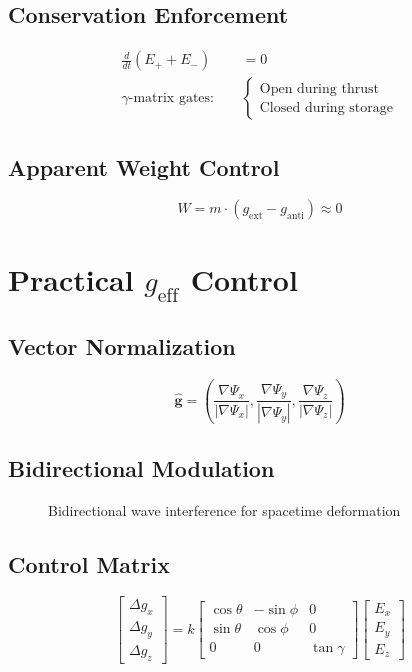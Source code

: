 \documentclass{article}
\begin{document}
\subsection{Conservation Enforcement}
\begin{align*}
\frac{d}{dt}(E_+ + E_-) &= 0 \\
\gamma\text{-matrix gates}: \quad & \begin{cases} 
\text{Open during thrust} \\
\text{Closed during storage}
\end{cases}
\end{align*}

\subsection{Apparent Weight Control}
\begin{equation}
W = m \cdot (g_{\text{ext}} - g_{\text{anti}}) \approx 0
\end{equation}

\section{Practical $g_{\text{eff}}$ Control}
\subsection{Vector Normalization}
\begin{equation}
\hat{\mathbf{g}} = \left( \frac{\nabla \Psi_x}{|\nabla \Psi_x|}, \frac{\nabla \Psi_y}{|\nabla \Psi_y|}, \frac{\nabla \Psi_z}{|\nabla \Psi_z|} \right)
\end{equation}

\subsection{Bidirectional Modulation}
\begin{figure}[h]
\centering
\caption{Bidirectional wave interference for spacetime deformation}
\end{figure}

\subsection{Control Matrix}
\begin{equation}
\begin{bmatrix}
\Delta g_x \\ \Delta g_y \\ \Delta g_z
\end{bmatrix} = k \begin{bmatrix}
\cos\theta & -\sin\phi & 0 \\
\sin\theta & \cos\phi & 0 \\
0 & 0 & \tan\gamma
\end{bmatrix} \begin{bmatrix}
E_x \\ E_y \\ E_z
\end{bmatrix}
\end{equation}
\end{document}
